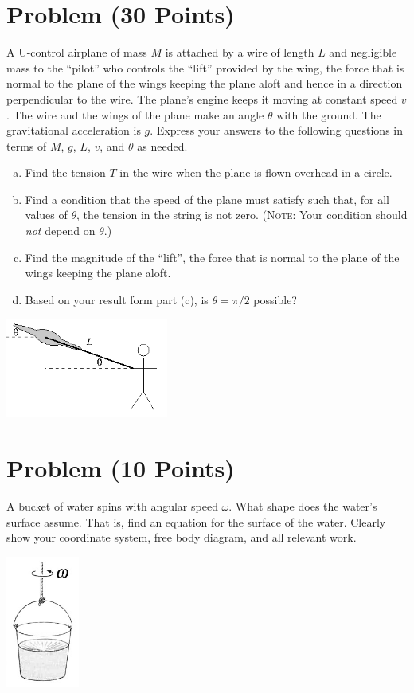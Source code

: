 \documentclass[problems]{esg8012exam}
\begin{document}
\section{Problem \thesection\space(30 Points)}
  A U-control airplane of mass $M$ is attached by a wire of length $L$ and negligible mass to the ``pilot'' who controls the ``lift'' provided by the wing, the force that is normal to the plane of the wings keeping the plane aloft and hence in a direction perpendicular to the wire.  The plane's engine keeps it moving at constant speed $v$.  The wire and the wings of the plane make an angle $\theta$ with the ground.  The gravitational acceleration is $g$.  Express your answers to the following questions in terms of $M$, $g$, $L$, $v$, and $\theta$ as needed.
  \begin{enumerate}[(a)]
    \item Find the tension $T$ in the wire when the plane is flown overhead in a circle.
    \item Find a condition that the speed of the plane must satisfy such that, for all values of $\theta$, the tension in the string is not zero. (\textsc{Note}: Your condition should \emph{not} depend on $\theta$.)
    \item Find the magnitude of the ``lift'', the force that is normal to the plane of the wings keeping the plane aloft.
    \item Based on your result form part (c), is $\theta = \pi / 2$ possible?
  \end{enumerate}
  \begin{center}\includegraphics[width=0.4\textwidth]{exam1_p3_1}\end{center}
\section{Problem \thesection\space(10 Points)}
  A bucket of water spins with angular speed $\omega$.  What shape does the water's surface assume.  That is, find an equation for the surface of the water.  Clearly show your coordinate system, free body diagram, and all relevant work.
  \begin{center}
    \includegraphics[width=0.18\textwidth]{exam1_p4_1}
  \end{center}
\end{document}
